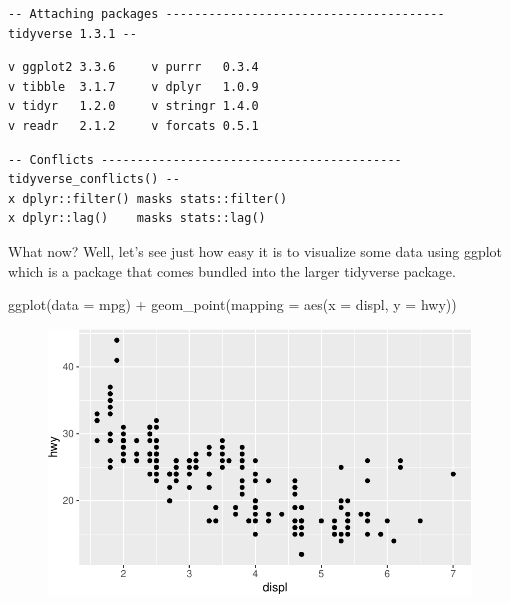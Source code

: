 \documentclass[
  letterpaper,
  DIV=11,
  numbers=noendperiod]{scrreprt}
\newenvironment{Shaded}{\begin{snugshade}}{\end{snugshade}}
\newcommand{\AttributeTok}[1]{\textcolor[rgb]{0.40,0.45,0.13}{#1}}
\newcommand{\FunctionTok}[1]{\textcolor[rgb]{0.28,0.35,0.67}{#1}}
\newcommand{\NormalTok}[1]{\textcolor[rgb]{0.00,0.23,0.31}{#1}}
\newcommand{\SpecialCharTok}[1]{\textcolor[rgb]{0.37,0.37,0.37}{#1}}
\begin{document}
\begin{verbatim}
-- Attaching packages --------------------------------------- tidyverse 1.3.1 --
\end{verbatim}

\begin{verbatim}
v ggplot2 3.3.6     v purrr   0.3.4
v tibble  3.1.7     v dplyr   1.0.9
v tidyr   1.2.0     v stringr 1.4.0
v readr   2.1.2     v forcats 0.5.1
\end{verbatim}

\begin{verbatim}
-- Conflicts ------------------------------------------ tidyverse_conflicts() --
x dplyr::filter() masks stats::filter()
x dplyr::lag()    masks stats::lag()
\end{verbatim}

What now? Well, let's see just how easy it is to visualize some data
using ggplot which is a package that comes bundled into the larger
tidyverse package.

\begin{Shaded}
\begin{Highlighting}[]
\FunctionTok{ggplot}\NormalTok{(}\AttributeTok{data =}\NormalTok{ mpg) }\SpecialCharTok{+} 
  \FunctionTok{geom\_point}\NormalTok{(}\AttributeTok{mapping =} \FunctionTok{aes}\NormalTok{(}\AttributeTok{x =}\NormalTok{ displ, }\AttributeTok{y =}\NormalTok{ hwy))}
\end{Highlighting}
\end{Shaded}

\begin{figure}[H]

{\centering \includegraphics{./intror_files/figure-pdf/unnamed-chunk-12-1.pdf}

}

\end{figure}
\end{document}
